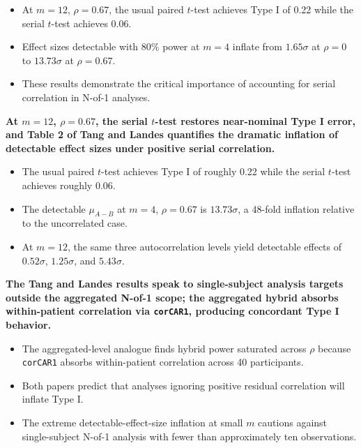 \documentclass[
  11pt,
]{article}
\begin{document}
\begin{itemize}\setlength{\itemsep}{2pt}\setlength{\parskip}{0pt}
\item At $m = 12$, $\rho = 0.67$, the usual paired $t$-test achieves Type I of 0.22 while the serial $t$-test achieves 0.06.
\item Effect sizes detectable with 80\% power at $m = 4$ inflate from $1.65\sigma$ at $\rho = 0$ to $13.73\sigma$ at $\rho = 0.67$.
\item These results demonstrate the critical importance of accounting for serial correlation in N-of-1 analyses.
\end{itemize}

\textbf{At $m = 12$, $\rho = 0.67$, the serial $t$-test restores near-nominal Type I error, and Table 2 of Tang and Landes quantifies the dramatic inflation of detectable effect sizes under positive serial correlation.}

\begin{itemize}\setlength{\itemsep}{2pt}\setlength{\parskip}{0pt}
\item The usual paired $t$-test achieves Type I of roughly 0.22 while the serial $t$-test achieves roughly 0.06.
\item The detectable $\mu_{A-B}$ at $m = 4$, $\rho = 0.67$ is $13.73\sigma$, a 48-fold inflation relative to the uncorrelated case.
\item At $m = 12$, the same three autocorrelation levels yield detectable effects of $0.52\sigma$, $1.25\sigma$, and $5.43\sigma$.
\end{itemize}

\textbf{The Tang and Landes results speak to single-subject analysis targets outside the aggregated N-of-1 scope; the aggregated hybrid absorbs within-patient correlation via \texttt{corCAR1}, producing concordant Type I behavior.}

\begin{itemize}\setlength{\itemsep}{2pt}\setlength{\parskip}{0pt}
\item The aggregated-level analogue finds hybrid power saturated across $\rho$ because \texttt{corCAR1} absorbs within-patient correlation across 40 participants.
\item Both papers predict that analyses ignoring positive residual correlation will inflate Type I.
\item The extreme detectable-effect-size inflation at small $m$ cautions against single-subject N-of-1 analysis with fewer than approximately ten observations.
\end{itemize}
\end{document}
